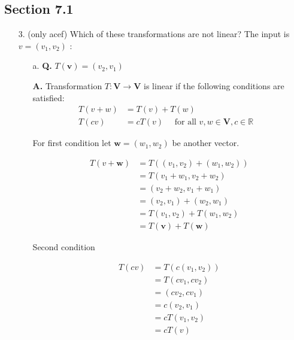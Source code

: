 \documentclass[main.tex]{subfiles}
\begin{document}
\subsection{Section 7.1}
\begin{enumerate}
    \item [3.] (only acef) Which of these transformations are not linear? The input is $v=\left(v_{1}, v_{2}\right)$ :
    \begin{enumerate}
        \item [a.] \textbf{Q.} $T(\boldsymbol{v})=\left(v_{2}, v_{1}\right)$ 
        
        \textbf{A.} Transformation $T: \mathbf{V} \rightarrow \mathbf{V}$ is linear if the following conditions are satisfied:
        $$
        \begin{aligned}
        T(v+w) & =T(v)+T(w) & \\
        T(c v) & =c T(v) \quad \text { for all } v, w \in \mathbf{V}, c \in \mathbb{R}
        \end{aligned}
        $$

        For first condition let $\boldsymbol{w}=\left(w_{1}, w_{2}\right)$ be another vector.

        $$
        \begin{aligned}
        T(v+\boldsymbol{w}) &=T\left(\left(v_{1}, v_{2}\right)+\left(w_{1}, w_{2}\right)\right) \\
        &=T\left(v_{1}+w_{1}, v_{2}+w_{2}\right) \\
        &=\left(v_{2}+w_{2}, v_{1}+w_{1}\right) \\
        &=\left(v_{2}, v_{1}\right)+\left(w_{2}, w_{1}\right) \\
        &=T\left(v_{1}, v_{2}\right)+T\left(w_{1}, w_{2}\right) \\
        &=T(\boldsymbol{v})+T(\boldsymbol{w})
        \end{aligned}
        $$

        Second condition 

        $$
        \begin{aligned}
        T(c v) &=T\left(c\left(v_{1}, v_{2}\right)\right) \\
        &=T\left(c v_{1}, c v_{2}\right) \\
        &=\left(c v_{2}, c v_{1}\right) \\
        &=c\left(v_{2}, v_{1}\right) \\
        &=c T\left(v_{1}, v_{2}\right) \\
        &=c T(v)
        \end{aligned}
        $$


\end{enumerate}
\end{enumerate}
\end{document}

